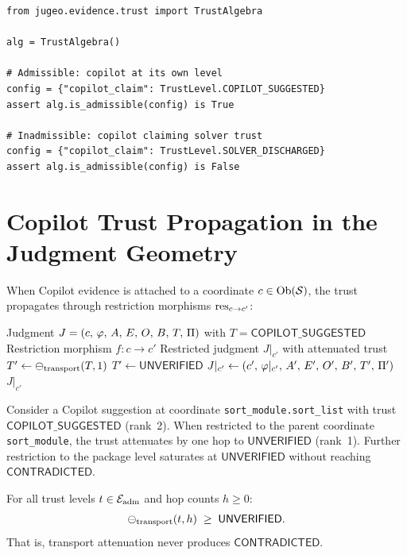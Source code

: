 \documentclass[11pt]{article}
\newcommand{\CopSugg}{\mathsf{COPILOT\_SUGGESTED}}
\newcommand{\Unver}{\mathsf{UNVERIFIED}}
\newcommand{\Contra}{\mathsf{CONTRADICTED}}
\begin{document}
\begin{lstlisting}[style=jugeo-python]
from jugeo.evidence.trust import TrustAlgebra

alg = TrustAlgebra()

# Admissible: copilot at its own level
config = {"copilot_claim": TrustLevel.COPILOT_SUGGESTED}
assert alg.is_admissible(config) is True

# Inadmissible: copilot claiming solver trust
config = {"copilot_claim": TrustLevel.SOLVER_DISCHARGED}
assert alg.is_admissible(config) is False
\end{lstlisting}

\section{Copilot Trust Propagation in the Judgment Geometry}\label{sec:propagation}

When Copilot evidence is attached to a coordinate $c \in \mathrm{Ob}(\mathcal{S})$, the
trust propagates through restriction morphisms $\mathrm{res}_{c \to c'}$:

\begin{algorithm}[h]
\caption{Trust Propagation Under Restriction}
\label{alg:propagation}
\begin{algorithmic}[1]
\REQUIRE Judgment $J = (c,\,\varphi,\,A,\,E,\,O,\,B,\,T,\,\Pi)$ with $T = \CopSugg$
\REQUIRE Restriction morphism $f: c \to c'$
\ENSURE Restricted judgment $J|_{c'}$ with attenuated trust
\STATE $T' \gets \ominus_{\mathrm{transport}}(T, 1)$
\IF{$T' < \Unver$}
  \STATE $T' \gets \Unver$ 
\ENDIF
\STATE $J|_{c'} \gets (c',\,\varphi|_{c'},\,A',\,E',\,O',\,B',\,T',\,\Pi')$
\RETURN $J|_{c'}$
\end{algorithmic}
\end{algorithm}

\begin{example}\label{ex:module}
Consider a Copilot suggestion at coordinate \texttt{sort\_module.sort\_list}
with trust $\CopSugg$ (rank~2).  When restricted to the parent coordinate
\texttt{sort\_module}, the trust attenuates by one hop to $\Unver$ (rank~1).
Further restriction to the package level saturates at $\Unver$ without
reaching $\Contra$.
\end{example}

\begin{theorem}\label{thm:transport-mono}
For all trust levels $t \in \mathcal{E}_{\mathrm{adm}}$ and hop counts $h \geq 0$:
\[
  \tatten_{\mathrm{transport}}(t, h) \;\geq\; \Unver.
\]
That is, transport attenuation never produces $\Contra$.
\end{theorem}
\end{document}

